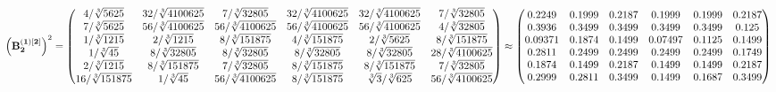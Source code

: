 \documentclass[10pt,a4paper]{article}
\begin{document}
	\[
		\left(\bold{B_2^{(1)[2]}}\right)^{2} = 
		\begin{pmatrix}
			{{4}} / {\sqrt[3]{5625}} & {{32}} / {\sqrt[3]{4100625}} & {{7}} / {\sqrt[3]{32805}} & {{32}} / {\sqrt[3]{4100625}} & {{32}} / {\sqrt[3]{4100625}} & {{7}} / {\sqrt[3]{32805}} \\
			{{7}} / {\sqrt[3]{5625}} & {{56}} / {\sqrt[3]{4100625}} & {{56}} / {\sqrt[3]{4100625}} & {{56}} / {\sqrt[3]{4100625}} & {{56}} / {\sqrt[3]{4100625}} & {{4}} / {\sqrt[3]{32805}} \\
			{1} / {\sqrt[3]{1215}} & {{2}} / {\sqrt[3]{1215}} & {{8}} / {\sqrt[3]{151875}} & {{4}} / {\sqrt[3]{151875}} & {{2}} / {\sqrt[3]{5625}} & {{8}} / {\sqrt[3]{151875}} \\
			{1} / {\sqrt[3]{45}} & {{8}} / {\sqrt[3]{32805}} & {{8}} / {\sqrt[3]{32805}} & {{8}} / {\sqrt[3]{32805}} & {{8}} / {\sqrt[3]{32805}} & {{28}} / {\sqrt[3]{4100625}} \\
			{{2}} / {\sqrt[3]{1215}} & {{8}} / {\sqrt[3]{151875}} & {{7}} / {\sqrt[3]{32805}} & {{8}} / {\sqrt[3]{151875}} & {{8}} / {\sqrt[3]{151875}} & {{7}} / {\sqrt[3]{32805}} \\
			{{16}} / {\sqrt[3]{151875}} & {1} / {\sqrt[3]{45}} & {{56}} / {\sqrt[3]{4100625}} & {{8}} / {\sqrt[3]{151875}} & {\sqrt[3]{3}} / {\sqrt[3]{625}} & {{56}} / {\sqrt[3]{4100625}} \\
		\end{pmatrix}
		\approx
		\begin{pmatrix}
			0.2249   & 0.1999   & 0.2187   & 0.1999   & 0.1999   & 0.2187   \\
			0.3936   & 0.3499   & 0.3499   & 0.3499   & 0.3499   & 0.125    \\
			0.09371  & 0.1874   & 0.1499   & 0.07497  & 0.1125   & 0.1499   \\
			0.2811   & 0.2499   & 0.2499   & 0.2499   & 0.2499   & 0.1749   \\
			0.1874   & 0.1499   & 0.2187   & 0.1499   & 0.1499   & 0.2187   \\
			0.2999   & 0.2811   & 0.3499   & 0.1499   & 0.1687   & 0.3499   \\
		\end{pmatrix}
	\]
\end{document}
